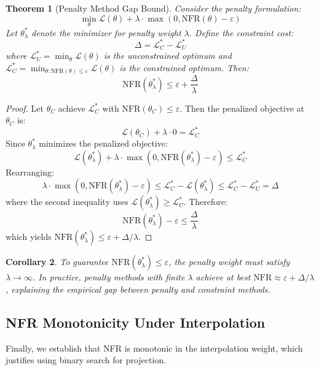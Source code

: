 \documentclass[12pt, letterpaper]{article}
\newtheorem{theorem}{Theorem}[section]
\newtheorem{corollary}[theorem]{Corollary}
\theoremstyle{remark}
\begin{document}
\begin{theorem}[Penalty Method Gap Bound]\label{thm:penalty-gap}
Consider the penalty formulation:
\[
\min_\theta \mathcal{L}(\theta) + \lambda \cdot \max(0, \mathrm{NFR}(\theta) - \varepsilon)
\]
Let $\theta^*_\lambda$ denote the minimizer for penalty weight $\lambda$. Define the \emph{constraint cost}:
\[
\Delta = \mathcal{L}^*_C - \mathcal{L}^*_U
\]
where $\mathcal{L}^*_U = \min_\theta \mathcal{L}(\theta)$ is the unconstrained optimum and $\mathcal{L}^*_C = \min_{\theta: \mathrm{NFR}(\theta) \leq \varepsilon} \mathcal{L}(\theta)$ is the constrained optimum. Then:
\[
\mathrm{NFR}(\theta^*_\lambda) \leq \varepsilon + \frac{\Delta}{\lambda}
\]
\end{theorem}

\begin{proof}
Let $\theta_C$ achieve $\mathcal{L}^*_C$ with $\mathrm{NFR}(\theta_C) \leq \varepsilon$. Then the penalized objective at $\theta_C$ is:
\[
\mathcal{L}(\theta_C) + \lambda \cdot 0 = \mathcal{L}^*_C
\]
Since $\theta^*_\lambda$ minimizes the penalized objective:
\[
\mathcal{L}(\theta^*_\lambda) + \lambda \cdot \max(0, \mathrm{NFR}(\theta^*_\lambda) - \varepsilon) \leq \mathcal{L}^*_C
\]
Rearranging:
\[
\lambda \cdot \max(0, \mathrm{NFR}(\theta^*_\lambda) - \varepsilon) \leq \mathcal{L}^*_C - \mathcal{L}(\theta^*_\lambda) \leq \mathcal{L}^*_C - \mathcal{L}^*_U = \Delta
\]
where the second inequality uses $\mathcal{L}(\theta^*_\lambda) \geq \mathcal{L}^*_U$. Therefore:
\[
\mathrm{NFR}(\theta^*_\lambda) - \varepsilon \leq \frac{\Delta}{\lambda}
\]
which yields $\mathrm{NFR}(\theta^*_\lambda) \leq \varepsilon + \Delta/\lambda$.
\end{proof}

\begin{corollary}\label{cor:penalty-lambda}
To guarantee $\mathrm{NFR}(\theta^*_\lambda) \leq \varepsilon$, the penalty weight must satisfy $\lambda \to \infty$. In practice, penalty methods with finite $\lambda$ achieve at best $\mathrm{NFR} \approx \varepsilon + \Delta/\lambda$, explaining the empirical gap between penalty and constraint methods.
\end{corollary}

\subsection{NFR Monotonicity Under Interpolation}

Finally, we establish that NFR is monotonic in the interpolation weight, which justifies using binary search for projection.
\end{document}
